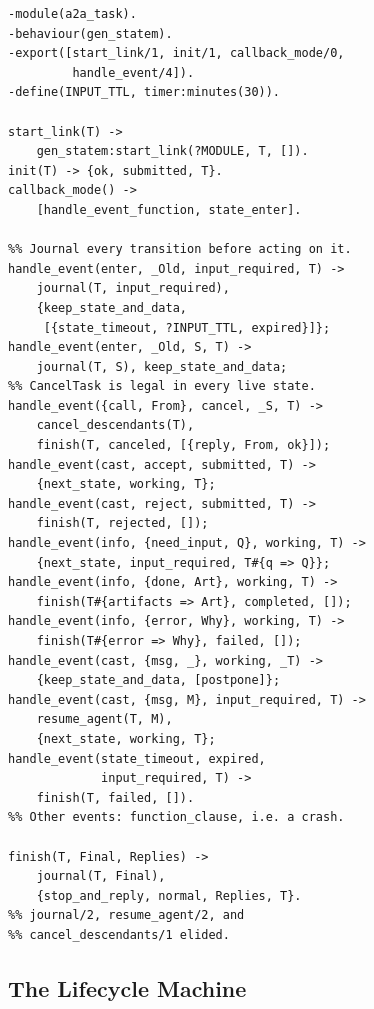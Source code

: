 \documentclass[conference,letterpaper]{IEEEtran}
\newcommand{\code}[1]{\texttt{#1}}
\newcommand{\gsm}{\code{gen\_statem}}
\begin{document}
\begin{lstlisting}[float=t, caption={Core of the A2A task lifecycle as a
\gsm{} (\code{auth\_required} clauses are analogous and elided).},
label={lst:fsm}]
-module(a2a_task).
-behaviour(gen_statem).
-export([start_link/1, init/1, callback_mode/0,
         handle_event/4]).
-define(INPUT_TTL, timer:minutes(30)).

start_link(T) ->
    gen_statem:start_link(?MODULE, T, []).
init(T) -> {ok, submitted, T}.
callback_mode() ->
    [handle_event_function, state_enter].

%% Journal every transition before acting on it.
handle_event(enter, _Old, input_required, T) ->
    journal(T, input_required),
    {keep_state_and_data,
     [{state_timeout, ?INPUT_TTL, expired}]};
handle_event(enter, _Old, S, T) ->
    journal(T, S), keep_state_and_data;
%% CancelTask is legal in every live state.
handle_event({call, From}, cancel, _S, T) ->
    cancel_descendants(T),
    finish(T, canceled, [{reply, From, ok}]);
handle_event(cast, accept, submitted, T) ->
    {next_state, working, T};
handle_event(cast, reject, submitted, T) ->
    finish(T, rejected, []);
handle_event(info, {need_input, Q}, working, T) ->
    {next_state, input_required, T#{q => Q}};
handle_event(info, {done, Art}, working, T) ->
    finish(T#{artifacts => Art}, completed, []);
handle_event(info, {error, Why}, working, T) ->
    finish(T#{error => Why}, failed, []);
handle_event(cast, {msg, _}, working, _T) ->
    {keep_state_and_data, [postpone]};
handle_event(cast, {msg, M}, input_required, T) ->
    resume_agent(T, M),
    {next_state, working, T};
handle_event(state_timeout, expired,
             input_required, T) ->
    finish(T, failed, []).
%% Other events: function_clause, i.e. a crash.

finish(T, Final, Replies) ->
    journal(T, Final),
    {stop_and_reply, normal, Replies, T}.
%% journal/2, resume_agent/2, and
%% cancel_descendants/1 elided.
\end{lstlisting}

\subsection{The Lifecycle Machine}
\end{document}

